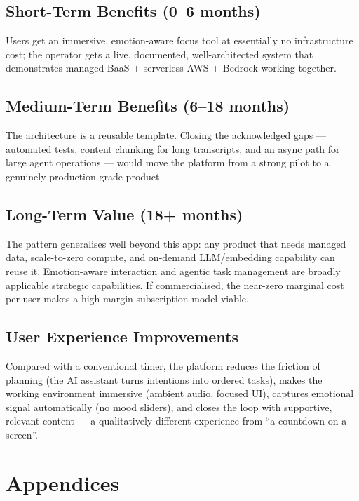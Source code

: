 \documentclass[a4paper,11pt]{article}
\begin{document}
	\subsection{Short-Term Benefits (0--6 months)}
	Users get an immersive, emotion-aware focus tool at essentially no infrastructure cost; the
	operator gets a live, documented, well-architected system that demonstrates managed BaaS +
	serverless AWS + Bedrock working together.

	\subsection{Medium-Term Benefits (6--18 months)}
	The architecture is a reusable template. Closing the acknowledged gaps --- automated tests,
	content chunking for long transcripts, and an async path for large agent operations ---
	would move the platform from a strong pilot to a genuinely production-grade product.

	\subsection{Long-Term Value (18+ months)}
	The pattern generalises well beyond this app: any product that needs managed data,
	scale-to-zero compute, and on-demand LLM/embedding capability can reuse it. Emotion-aware
	interaction and agentic task management are broadly applicable strategic capabilities. If
	commercialised, the near-zero marginal cost per user makes a high-margin subscription model
	viable.

	\subsection{User Experience Improvements}
	Compared with a conventional timer, the platform reduces the friction of planning (the AI
	assistant turns intentions into ordered tasks), makes the working environment immersive
	(ambient audio, focused UI), captures emotional signal automatically (no mood sliders), and
	closes the loop with supportive, relevant content --- a qualitatively different experience
	from ``a countdown on a screen''.

	\clearpage
	\appendix
	\renewcommand{\thesection}{\Alph{section}}
	\section*{Appendices}
\end{document}
